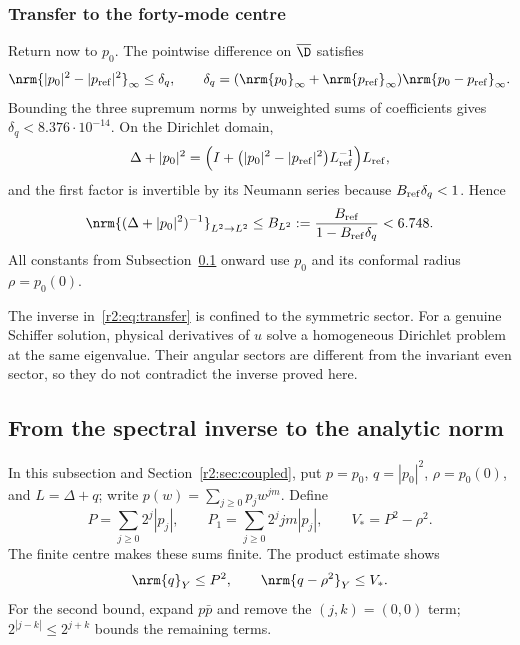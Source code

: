 \subsubsection{Transfer to the forty-mode centre}
Return now to $p_0$. The pointwise difference on $\overline\D$ satisfies
\begin{equation}\label{r2:eq:transfer-difference}
 \nrm{|p_0|^2-|p_{\rm ref}|^2}_\infty\le\delta_q,
 \qquad
 \delta_q=(\nrm{p_0}_\infty+\nrm{p_{\rm ref}}_\infty)
 \nrm{p_0-p_{\rm ref}}_\infty.
\end{equation}
Bounding the three supremum norms by unweighted sums of coefficients gives $\delta_q<8.376\cdot10^{-14}$. On the Dirichlet domain,
\[
 \Delta+|p_0|^2
 =\Bigl(I+\bigl(|p_0|^2-|p_{\rm ref}|^2\bigr)L_{\rm ref}^{-1}\Bigr)L_{\rm ref},
\]
and the first factor is invertible by its Neumann series because $B_{\rm ref}\delta_q<1$. Hence
\begin{equation}\label{r2:eq:transfer}
 \nrm{(\Delta+|p_0|^2)^{-1}}_{L^2\to L^2}\le
 B_{L^2}:=\frac{B_{\rm ref}}{1-B_{\rm ref}\delta_q}<6.748.
\end{equation}
All constants from Subsection~\ref{r2:sec:analytic} onward use $p_0$ and its conformal radius $\rho=p_0(0)$.

\begin{remark}
The inverse in~\eqref{r2:eq:transfer} is confined to the symmetric sector. For a genuine Schiffer solution, physical derivatives of $u$ solve a homogeneous Dirichlet problem at the same eigenvalue. Their angular sectors are different from the invariant even sector, so they do not contradict the inverse proved here.
\end{remark}

\subsection{From the spectral inverse to the analytic norm}\label{r2:sec:analytic}

In this subsection and Section~\ref{r2:sec:coupled}, put $p=p_0$, $q=|p_0|^2$, $\rho=p_0(0)$, and $L=\Delta+q$; write $p(w)=\sum_{j\ge0}p_jw^{jm}$. Define
\begin{equation}\label{r2:eq:P-bounds}
 P=\sum_{j\ge0}2^j|p_j|,\qquad
 P_1=\sum_{j\ge0}2^j jm|p_j|,\qquad V_*=P^2-\rho^2.
\end{equation}
The finite centre makes these sums finite. The product estimate shows
\begin{equation}\label{r2:eq:V-analytic}
 \nrm{q}_Y\le P^2,
 \qquad\nrm{q-\rho^2}_Y\le V_*.
\end{equation}
For the second bound, expand $p\bar p$ and remove the $(j,k)=(0,0)$ term; $2^{|j-k|}\le2^{j+k}$ bounds the remaining terms.

